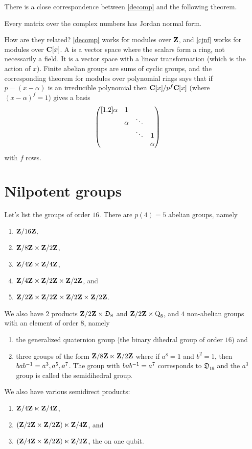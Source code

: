 \documentclass[11pt, twoside]{amsart}
\begin{document}
There is a close correspondence between \cref{decomp} and the following theorem.
\begin{theorem}\label{cjnf}
Every matrix over the complex numbers has Jordan normal form. 
\end{theorem}
How are they related? \cref{decomp} works for modules over $\mathbf{Z}$, and \cref{cjnf} works for modules over $\mathbf C[x]$. A  is a vector space where the scalars form a ring, not necessarily a field. It is a vector space with a linear transformation (which is the action of $x$). Finite abelian groups are sums of cyclic groups, and the corresponding theorem for modules over polynomial rings says that if $p = (x-\alpha)$ is an irreducible polynomial then $\mathbf C[x] / p^f \mathbf C[x] $ (where  $(x-\alpha)^f=1$) gives a basis
$$
\begin{pmatrix} [1.2] \alpha &1&  & \\ & \alpha& \ddots&   \\ &  & \ddots & 1 \\  &   &  & \alpha\end{pmatrix} 
$$
with $f$ rows. 

\section{Nilpotent groups}
Let's list the groups of order $16$. There are $p(4) = 5$ abelian groups, namely 
\begin{enumerate}
\item $\mathbf{Z}/16\mathbf{Z}$, 
\item $\mathbf{Z}/8\mathbf{Z} \times \mathbf{Z}/2\mathbf{Z} $, 
\item $\mathbf{Z}/4\mathbf{Z}  \times \mathbf{Z}/4\mathbf{Z} $, 
\item $\mathbf{Z}/4\mathbf{Z}  \times \mathbf{Z}/2\mathbf{Z}  \times \mathbf{Z}/2\mathbf{Z} $, and 
\item $\mathbf{Z}/2\mathbf{Z}  \times \mathbf{Z}/2\mathbf{Z}  \times \mathbf{Z}/2\mathbf{Z}  \times \mathbf{Z}/2\mathbf{Z} $.
\end{enumerate}
We also have $2$ products $\mathbf{Z}/2\mathbf{Z} \times \mathfrak{D}_8$ and $\mathbf{Z}/2\mathbf{Z} \times \operatorname{Q}_8 $, and $4$ non-abelian groups with an element of order $8$, namely
\begin{enumerate}
\item the generalized quaternion group (the binary dihedral group of order $16$) and
\item three groups of the form $\mathbf{Z}/8\mathbf{Z}  \ltimes \mathbf{Z}/2\mathbf{Z} $ where if $a^8 = 1$ and $b^2=1$, then $bab^{-1} = a^3,a^5,a^7$. The group with $bab^{-1} = a^7$ corresponds to $\mathfrak{D}_{16}$ and the $a^3$ group is called the semidihedral group.
\end{enumerate}
We also have various semidirect products:
\begin{enumerate}
\item $\mathbf{Z}/4\mathbf{Z} \ltimes \mathbf{Z}/4\mathbf{Z} $,
\item $(\mathbf{Z}/2\mathbf{Z} \times \mathbf{Z}/2\mathbf{Z} ) \ltimes \mathbf{Z}/4\mathbf{Z} $, and
\item $(\mathbf{Z}/4\mathbf{Z}  \times \mathbf{Z}/2\mathbf{Z} ) \ltimes \mathbf{Z}/2\mathbf{Z} $, the  on one qubit.
\end{enumerate}
\end{document}
